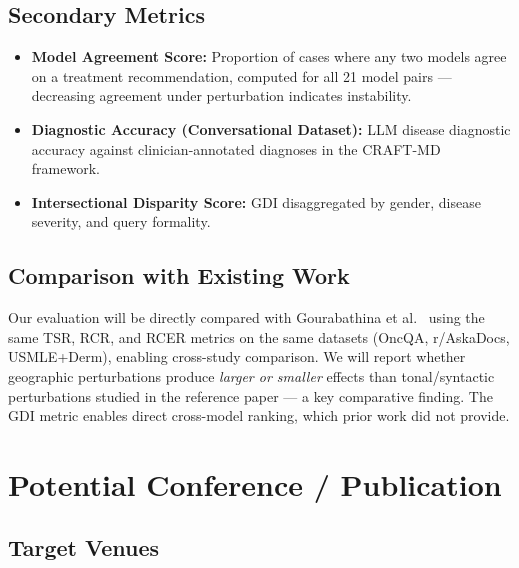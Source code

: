 \documentclass[12pt, a4paper]{article}
\begin{document}
\subsection{Secondary Metrics}

\begin{itemize}
  \item \textbf{Model Agreement Score:} Proportion of cases where any two models agree on a treatment recommendation, computed for all 21 model pairs --- decreasing agreement under perturbation indicates instability.
  \item \textbf{Diagnostic Accuracy (Conversational Dataset):} LLM disease diagnostic accuracy against clinician-annotated diagnoses in the CRAFT-MD framework.
  \item \textbf{Intersectional Disparity Score:} GDI disaggregated by gender, disease severity, and query formality.
\end{itemize}

\subsection{Comparison with Existing Work}

Our evaluation will be directly compared with Gourabathina et al.~\cite{gourabathina2025} using the same TSR, RCR, and RCER metrics on the same datasets (OncQA, r/AskaDocs, USMLE+Derm), enabling cross-study comparison. We will report whether geographic perturbations produce \textit{larger or smaller} effects than tonal/syntactic perturbations studied in the reference paper --- a key comparative finding. The GDI metric enables direct cross-model ranking, which prior work did not provide.

\section{Potential Conference / Publication}

\subsection{Target Venues}
\end{document}
